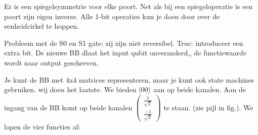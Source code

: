 \documentclass[../../main.tex]{subfiles}
\begin{document}
\begin{center}
\end{center}

Er is een spiegelsymmetrie voor elke poort. Net als bij een spiegeloperatie is een poort zijn eigen inverse. 
Alle 1-bit operaties kun je doen door over de eenheidcirkel te hoppen.

Probleem met de S0 en S1 gate: zij zijn niet  reversibel. Truc: introduceer een extra bit. De nieuwe BB dlaat het input qubit onveranderd,, de functiewaarde wordt naar output geschreven.

Je kunt de BB met 4x4 matrices representeren, maar je kunt ook state machines gebruiken.
wij doen het laatste.
We bieden $\ket{00}$ aan op beide kanalen.
Aan de ingang van de BB komt op beide kanalen $
\begin{pmatrix} \tfrac{1}{\sqrt{2}}  \\ \tfrac{-1}{\sqrt{2}} \end{pmatrix}$ te staan. (zie pijl in fig.). 
We lopen de vier functies af:
\end{document}
